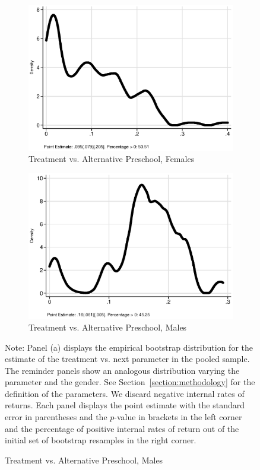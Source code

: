 \begin{figure}
\begin{subfigure}[h]{0.25\textwidth}
\end{subfigure}%
\begin{subfigure}[h]{0.25\textwidth}
	\centering
	\caption{Treatment vs. Alternative Preschool, Females}
		\includegraphics[width=\textwidth]{output/irr_8_sexf.eps}
\end{subfigure}%
\begin{subfigure}[h]{0.25\textwidth}
	\centering
	\caption{Treatment vs. Alternative Preschool, Males}
		\includegraphics[width=\textwidth]{output/irr_8_sexm.eps}
\end{subfigure}
\footnotesize \justify
Note: Panel (a) displays the empirical bootstrap distribution for the estimate of the treatment vs. next parameter in the pooled sample. The reminder panels show an analogous distribution varying the parameter and the gender. See Section~\ref{section:methodology} for the definition of the parameters. We discard negative internal rates of returns. Each panel displays the point estimate with the standard error in parentheses and the $p$-value in brackets in the left corner and the percentage of positive internal rates of return out of the initial set of bootstrap resamples in the right corner.
\end{figure}
\restoregeometry
\doublespacing



